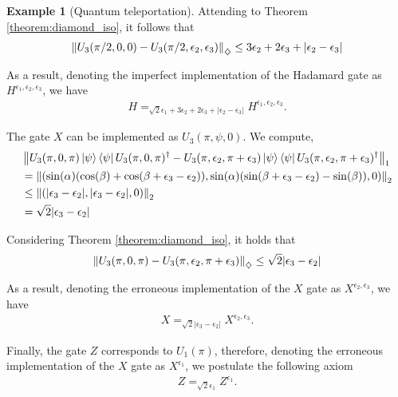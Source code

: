 \documentclass[10pt,a4paper]{amsart}
\theoremstyle{definition}
\theoremstyle{definition}
\newtheorem{example}[definition]{Example}
\theoremstyle{definition}
\theoremstyle{definition}
\theoremstyle{definition}
\theoremstyle{definition}
\begin{document}
\begin{example}[Quantum teleportation]
    Attending to Theorem \ref{theorem:diamond_iso}, it follows that
    \begin{align*}
      \left\lVert U_3(\pi/2, 0, 0)- U_3(\pi/2, \epsilon_2, \epsilon_3)  \right\rVert_{\diamondsuit} \leq 3 \epsilon_2 +  2\epsilon_3 + |\epsilon_2-\epsilon_3|
    \end{align*}
    
    As a result, denoting the imperfect implementation of the Hadamard gate as $H^{\epsilon_1 ,\epsilon_2, \epsilon_3}$, we have 
    \begin{align} \label{eq:h_error_telepor}
      H =_{ \sqrt{2}\epsilon_1 + 3 \epsilon_2 + 2\epsilon_3 + |\epsilon_2-\epsilon_3|} H^{\epsilon_1 ,\epsilon_2, \epsilon_3}.
    \end{align}
 

    The gate $X$ can be implemented as $U_3(\pi, \psi, 0)$. We compute,
    \begin{align*}
      &\left\lVert U_3(\pi, 0 , \pi) \ket{\psi}\bra{\psi}U_3(\pi,0,\pi)^\dag - U_3(\pi,\epsilon_2,\pi+\epsilon_3)  \ket{\psi}\bra{\psi}U_3(\pi,\epsilon_2,\pi+\epsilon_3)^\dag \right\rVert_{1}  \\
      & =\left\lVert ( \sin(\alpha) (\cos(\beta)+\cos(\beta + \epsilon_3-\epsilon_2)), \sin(\alpha) (\sin(\beta + \epsilon_3-\epsilon_2)-\sin(\beta)),0 ) \right\rVert_{2} \\
      &  \leq \left\lVert (|\epsilon_3-\epsilon_2|, |\epsilon_3-\epsilon_2|,0 ) \right\rVert_{2} \\
      & = \sqrt{2} |\epsilon_3-\epsilon_2|
    \end{align*}

    Considering Theorem \ref{theorem:diamond_iso}, it holds that
    \begin{align*}
      \left\lVert U_3(\pi, 0 , \pi)- U_3(\pi,\epsilon_2,\pi+\epsilon_3)  \right\rVert_{\diamondsuit} \leq \sqrt{2} |\epsilon_3-\epsilon_2|
    \end{align*}

    As a result, denoting the erroneous implementation of the $X$ gate as $X^{\epsilon_2, \epsilon_3}$, we have
    \begin{align} \label{eq:x_error_telepor}
      X =_{\sqrt{2} |\epsilon_3-\epsilon_2|} X^{\epsilon_2, \epsilon_3}.
    \end{align}
  

    Finally, the gate $Z$ corresponds to $U_1(\pi)$, therefore, denoting the erroneous implementation of the $X$ gate as $X^{\epsilon_1}$, we postulate the following axiom
    \begin{align} \label{eq:Correction_error_telepor}
      Z =_{\sqrt{2} \epsilon_1} Z^{\epsilon_1}.
    \end{align}


\end{example}
\end{document}

